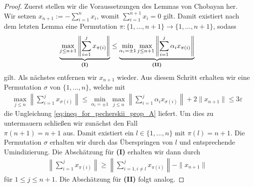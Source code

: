 \begin{proof}
	Zuerst stellen wir die Voraussetzungen des Lemmas von Chobayan her.
	Wir setzen $ x_{n+1} := - \sum_{i = 1}^n x_i $, womit 
	$ \sum_{i = 1}^{n+1} x_i = 0 $ gilt.
	Damit existiert nach dem letzten Lemma eine Permutation $ \pi : \{1,...,n+1\} \to \{1,...,n+1\} $, sodass
	\begin{align*}
		\underbrace{\max 
			\limits_{j \leq n +1  }
			\left\|
			\sum \limits_{i = 1}^j x_{\pi(i)}
			\right\|}_{\textbf{\textrm{(I)}}}
		\leq 
		\underbrace{\min \limits_{\alpha_i = \pm 1}
			\max 
			\limits_{j \leq n +1  }
			\left\|
			\sum \limits_{i = 1}^j \alpha_i x_{\pi(i)}
			\right\|}_{\textbf{\textrm{(II)}}}
	\end{align*}
	gilt. Als nächstes entfernen wir $ x_{n+1} $ wieder. Aus diesem Schritt erhalten wir eine Permutation $ \sigma $ von $ \{1,...,n\} $, welche mit
	\begin{align*}
		\max \limits_{j \leq n} 
		\left\|
		\sum \limits_{i = 1}^j
		x_{\sigma(i)}
		\right\| 
		\leq 
		\min \limits_{\alpha_i = \pm 1}
		\max 
		\limits_{j \leq n   }
		\left\|
		\sum \limits_{i = 1}^j \alpha_i x_{\sigma(i)}
		\right\|
		+ 
		2 \| x_{n+1} \|
		\leq 3 \varepsilon 
	\end{align*} 
	die Ungleichung \eqref{eq:ineq_for_pecherskii_prop_A} liefert.
	Um dies zu untermauern schließen wir zunächst den Fall\\ $ \pi(n+1) = n+1 $ aus.
	Damit existiert ein $ l \in \{ 1,...,n\} $ mit $ \pi(l) = n+1 $. Die Permutation $ \sigma  $ erhalten wir durch das Überspringen von $ l $ und entsprechende Umindizierung.
	Die Abschätzung für \textbf{\textrm{(I)}} erhalten wir dann durch
	\begin{align*}
		\left\|
		\sum \limits_{i = 1}^j
		x_{\pi(i)}
		\right\| 
		\geq 
		\left\|
		\sum \limits_{i = 1, i \neq l}^j
		x_{\pi(i)}
		\right\|  -\| x_{n+1} \|
	\end{align*}
	für $ 1 \leq j \leq n+1 $. Die Abschätzung für \textbf{\textrm{(II)}} folgt analog.
	
	
\end{proof}
\newpage

